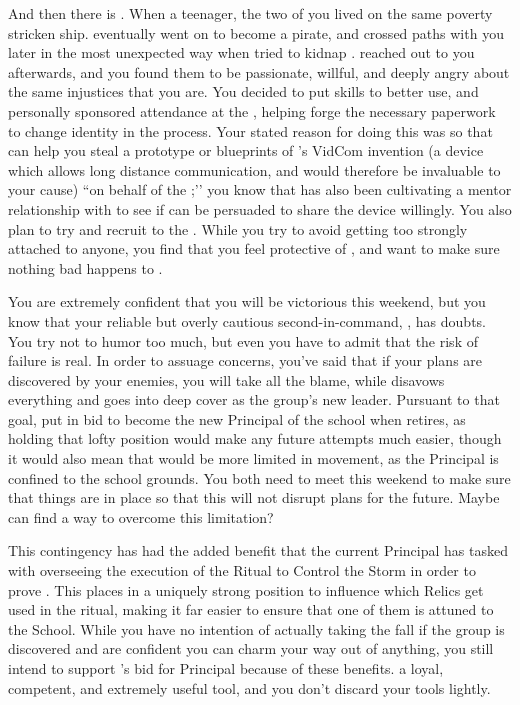 \documentclass[char]{GL2020}
\begin{document}
And then there is \cPirateChild{}. When \cPirateChild{\theywere} a teenager, the two of you lived on the same poverty stricken ship. \cPirateChild{} eventually went on to become a pirate, and crossed paths with you later in the most unexpected way when \cPirateChild{\they} tried to kidnap \cHeadDiplomat{}. \cPirateChild{\They} reached out to you afterwards, and you found them to be passionate, willful, and deeply angry about the same injustices that you are. You decided to put \cPirateChild{\their} skills to better use, and personally sponsored \cPirateChild{\their} attendance at the \pSchool{}, helping \cPirateChild{\them} forge the necessary paperwork to change \cPirateChild{\their} identity in the process. Your stated reason for doing this was so that \cPirateChild{\they} can help you steal a prototype or blueprints of \cTechStar{\intro}’s VidCom invention (a device which allows long distance communication, and would therefore be invaluable to your cause) ``on behalf of the \pShip{};’’ you know that \cChupInventor{} has also been cultivating a mentor relationship with \cTechStar{} to see if \cTechStar{\they} can be persuaded to share the device willingly. You also plan to try and recruit \cPirateChild{} to the \pGoaties{}. While you try to avoid getting too strongly attached to anyone, you find that you feel protective of \cPirateChild{\them}, and want to make sure nothing bad happens to \cPirateChild{\them}. 

You are extremely confident that you will be victorious this weekend, but you know that your reliable but overly cautious second-in-command, \cChupSecond{}, has doubts. You try not to humor \cChupSecond{\them} too much, but even you have to admit that the risk of failure is real. In order to assuage \cChupSecond{\their} concerns, you've said that if your plans are discovered by your enemies, you will take all the blame, while \cChupSecond{} disavows everything and goes into deep cover as the group's new leader. Pursuant to that goal, \cChupSecond{\they} put in \cChupSecond{\their} bid to become the new Principal of the school when \cPrincipal{\intro} retires, as holding that lofty position would make any future attempts much easier, though it would also mean that \cChupSecond{} would be more limited in movement, as the Principal is confined to the school grounds. You both need to meet this weekend to make sure that things are in place so that this will not disrupt plans for the future. Maybe \cGenesis{} can find a way to overcome this limitation?

This contingency has had the added benefit that the current Principal has tasked \cChupSecond{} with overseeing the execution of the Ritual to Control the Storm in order to prove \cChupSecond{\themself}. This places \cChupSecond{\them} in a uniquely strong position to influence which Relics get used in the ritual, making it far easier to ensure that one of them is attuned to the School. While you have no intention of actually taking the fall if the group is discovered and are confident you can charm your way out of anything, you still intend to support \cChupSecond{}’s bid for Principal because of these benefits. \cChupSecond{\Theyare} a loyal, competent, and extremely useful tool, and you don’t discard your tools lightly.
\end{document}
